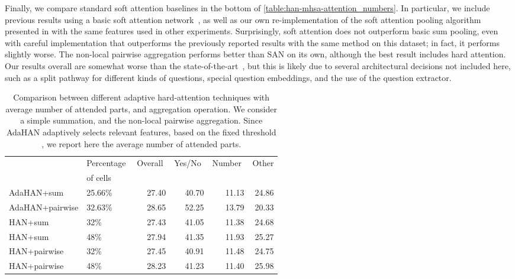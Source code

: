Finally, we compare standard soft attention baselines in the bottom of \autoref{table:han-mhsa-attention_numbers}.
In particular, we include previous results using a basic soft attention network~\cite{agrawal2017don,yang2015stacked}, as well as our own re-implementation of the soft attention pooling algorithm presented in \cite{agrawal2017don,yang2015stacked} with the same features used in other experiments.  
Surprisingly, soft attention does not outperform basic sum pooling, even with careful implementation that outperforms the previously reported results with the same method on this dataset; in fact, it performs slightly worse. 
The non-local pairwise aggregation performs better than SAN on its own, although the best result includes hard attention.
Our results overall are somewhat worse than the state-of-the-art~\cite{agrawal2017don}, but this is likely due to several architectural decisions not included here, such as a split pathway for different kinds of questions, special question embeddings, and the use of the question extractor.

\begin{table*}\begin{center}
\begin{tabular}{llrrrr}
\toprule
 & Percentage\,\, & Overall\,\, & Yes/No\,\, & Number\,\, & Other \\
 & of cells & & & \\
 \cmidrule(l){1-1}\cmidrule(lr){2-5}
 AdaHAN+sum & 25.66\% & 27.40 & 40.70 & 11.13 & 24.86 \\
 AdaHAN+pairwise  & 32.63\% & 28.65 & 52.25 & 13.79 & 20.33 \\
 \midrule
 HAN+sum  & 32\% & 27.43 & 41.05 & 11.38 & 24.68 \\
 HAN+sum  & 48\% & 27.94 & 41.35 & 11.93 & 25.27 \\
 HAN+pairwise  & 32\% & 27.45 & 40.91 & 11.48 & 24.75 \\
 HAN+pairwise  & 48\% & 28.23 & 41.23 & 11.40 & 25.98 \\
\bottomrule
\end{tabular}
\end{center}
\caption{
Comparison between different adaptive hard-attention techniques with average number of attended parts,  and aggregation operation. We consider a simple summation, and the non-local pairwise aggregation. 
Since AdaHAN adaptively selects relevant features, based on the fixed threshold , we report here the average number of attended parts.
}
\label{table:adaptive_han-attention_numbers}
\end{table*}

